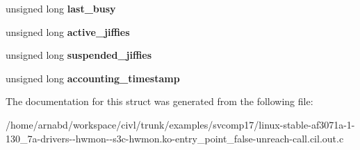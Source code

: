 \begin{DoxyCompactItemize}
\item 
\hypertarget{structdev__pm__info_a6b2b8107da1099e7288c0ec23ccd0f14}{}unsigned long {\bfseries last\+\_\+busy}\label{structdev__pm__info_a6b2b8107da1099e7288c0ec23ccd0f14}

\item 
\hypertarget{structdev__pm__info_a6c74d16bbcb664a081f1ed7c415bffea}{}unsigned long {\bfseries active\+\_\+jiffies}\label{structdev__pm__info_a6c74d16bbcb664a081f1ed7c415bffea}

\item 
\hypertarget{structdev__pm__info_aece3487eae4117bda0e4aadeb4ccf787}{}unsigned long {\bfseries suspended\+\_\+jiffies}\label{structdev__pm__info_aece3487eae4117bda0e4aadeb4ccf787}

\item 
\hypertarget{structdev__pm__info_afd8e7a638ef1a5e0e8e8a518e3da7e88}{}unsigned long {\bfseries accounting\+\_\+timestamp}\label{structdev__pm__info_afd8e7a638ef1a5e0e8e8a518e3da7e88}

\end{DoxyCompactItemize}


The documentation for this struct was generated from the following file\+:\begin{DoxyCompactItemize}
\item 
/home/arnabd/workspace/civl/trunk/examples/svcomp17/linux-\/stable-\/af3071a-\/1-\/130\+\_\+7a-\/drivers-\/-\/hwmon-\/-\/s3c-\/hwmon.\+ko-\/entry\+\_\+point\+\_\+false-\/unreach-\/call.\+cil.\+out.\+c\end{DoxyCompactItemize}
